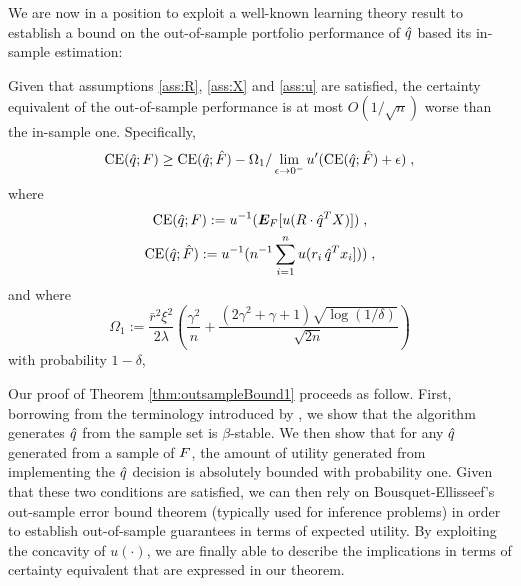 
We are now in a position to exploit a well-known learning theory result to establish a
bound on the out-of-sample portfolio performance of ${\hat{q}}$ based its in-sample
estimation:
\begin{thm}\label{thm:outsampleBound1}
  Given that assumptions \ref{ass:R}, \ref{ass:X} and \ref{ass:u} are satisfied, the
  certainty equivalent of the out-of-sample performance is at most $O(1/\sqrt{n})$ worse
  than the in-sample one. Specifically,
  \[ 
    \operatorname{CE}({\hat{q}};F) \geq \operatorname{CE}({\hat{q}};{\hat{F}}) -
    \Omega_1/\lim_{\epsilon\to0^-}u'(\operatorname{CE}({\hat{q}};{\hat{F}})+\epsilon)\;,
  \]
  where
  \begin{gather*}
    \operatorname{CE}({\hat{q}};F):=u^{-1}(\bm E_F[u(R\cdot{\hat{q}}^T X)])\;,\\
    \operatorname{CE}({\hat{q}};{\hat{F}}):=u^{-1}(n^{-1}\sum_{i=1}^n u(r_i\,{\hat{q}}^T x_i]))\;,
  \end{gather*}
  and where
  \[
    \Omega_1 := \frac{\bar{r}^2 \xi^2}{2\lambda} \left(\frac{\gamma^2}{n} +
      \frac{(2\gamma^2+\gamma+1)\sqrt{\log(1/\delta)}}{\sqrt{2n}}\right)
  \] 
  with probability $1-\delta$,
\end{thm}

Our proof of Theorem \ref{thm:outsampleBound1} proceeds as follow. First, borrowing from
the terminology introduced by \cite{bousquet2002stability}, we show that the algorithm
generates ${\hat{q}}$ from the sample set is $\beta$-stable. We then show that for any ${\hat{q}}$
generated from a sample of $F$, the amount of utility generated from implementing the
${\hat{q}}$ decision is absolutely bounded  with
probability one. Given that these two conditions are satisfied, we can then rely on
Bousquet-Ellisseef's out-sample error bound theorem (typically used for inference
problems) in order to establish out-of-sample guarantees in terms of expected utility. By
exploiting the concavity of $u(\cdot)$, we are finally able to describe the implications
in terms of certainty equivalent that are expressed in our theorem.



